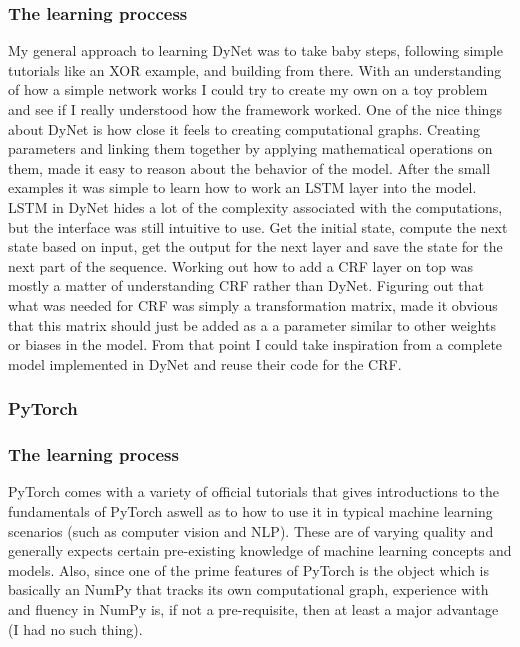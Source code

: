 \subsubsection*{The learning proccess}

My general approach to learning DyNet was to take baby steps, following simple
tutorials like an XOR example, and building from there. With an understanding of
how a simple network works I could try to create my own on a toy problem and see
if I really understood how the framework worked. One of the nice things about
DyNet is how close it feels to creating computational graphs. Creating
parameters and linking them together by applying mathematical operations on
them, made it easy to reason about the behavior of the model. After the small
examples it was simple to learn how to work an LSTM layer into the model. LSTM
in DyNet hides a lot of the complexity associated with the computations, but the
interface was still intuitive to use. Get the initial state, compute the next
state based on input, get the output for the next layer and save the state for
the next part of the sequence. Working out how to add a CRF layer on top was
mostly a matter of understanding CRF rather than DyNet. Figuring out that what
was needed for CRF was simply a transformation matrix, made it obvious that this
matrix should just be added as a a parameter similar to other weights or biases
in the model. From that point I could take inspiration from a complete model
implemented in DyNet and reuse their code for the CRF.\

\subsubsection{PyTorch}

\subsubsection*{The learning process}

PyTorch comes with a variety of official tutorials that gives introductions to
the fundamentals of PyTorch aswell as to how to use it in typical machine
learning scenarios (such as computer vision and NLP). These are of varying
quality and generally expects certain pre-existing knowledge of machine learning
concepts and models. Also, since one of the prime features of PyTorch is the
 object which is basically an NumPy  that tracks its
own computational graph, experience with and fluency in NumPy is, if not a
pre-requisite, then at least a major advantage (I had no such thing).

